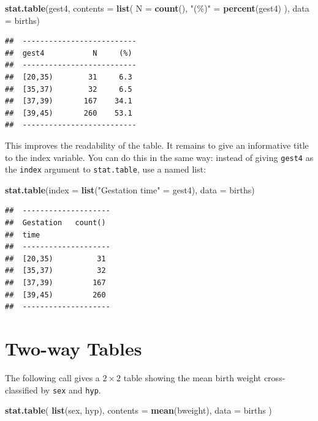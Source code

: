 \documentclass[
]{book}
\newenvironment{Shaded}{\begin{snugshade}}{\end{snugshade}}
\newcommand{\AttributeTok}[1]{\textcolor[rgb]{0.13,0.29,0.53}{#1}}
\newcommand{\FunctionTok}[1]{\textcolor[rgb]{0.13,0.29,0.53}{\textbf{#1}}}
\newcommand{\NormalTok}[1]{#1}
\newcommand{\OtherTok}[1]{\textcolor[rgb]{0.56,0.35,0.01}{#1}}
\newcommand{\StringTok}[1]{\textcolor[rgb]{0.31,0.60,0.02}{#1}}
\begin{document}
\begin{Shaded}
\begin{Highlighting}[]
\FunctionTok{stat.table}\NormalTok{(gest4, }\AttributeTok{contents =} \FunctionTok{list}\NormalTok{(}
  \AttributeTok{N =} \FunctionTok{count}\NormalTok{(),}
  \StringTok{"(\%)"} \OtherTok{=} \FunctionTok{percent}\NormalTok{(gest4)}
\NormalTok{), }\AttributeTok{data =}\NormalTok{ births)}
\end{Highlighting}
\end{Shaded}

\begin{verbatim}
##  -------------------------- 
##  gest4           N     (%)  
##  -------------------------- 
##  [20,35)        31     6.3  
##  [35,37)        32     6.5  
##  [37,39)       167    34.1  
##  [39,45)       260    53.1  
##  --------------------------
\end{verbatim}

This improves the readability of the table. It remains to give an
informative title to the index variable. You can do this in the same way:
instead of giving \texttt{gest4} as the \texttt{index} argument to \texttt{stat.table},
use a named list:

\begin{Shaded}
\begin{Highlighting}[]
\FunctionTok{stat.table}\NormalTok{(}\AttributeTok{index =} \FunctionTok{list}\NormalTok{(}\StringTok{"Gestation time"} \OtherTok{=}\NormalTok{ gest4), }\AttributeTok{data =}\NormalTok{ births)}
\end{Highlighting}
\end{Shaded}

\begin{verbatim}
##  -------------------- 
##  Gestation   count()  
##  time                 
##  -------------------- 
##  [20,35)          31  
##  [35,37)          32  
##  [37,39)         167  
##  [39,45)         260  
##  --------------------
\end{verbatim}

\section{Two-way Tables}\label{two-way-tables}

The following call gives a \(2\times 2\) table showing the mean birth weight
cross-classified by \texttt{sex} and \texttt{hyp}.

\begin{Shaded}
\begin{Highlighting}[]
\FunctionTok{stat.table}\NormalTok{(}
  \FunctionTok{list}\NormalTok{(sex, hyp), }
  \AttributeTok{contents =} \FunctionTok{mean}\NormalTok{(bweight), }
  \AttributeTok{data =}\NormalTok{ births}
\NormalTok{)}
\end{Highlighting}
\end{Shaded}
\end{document}
